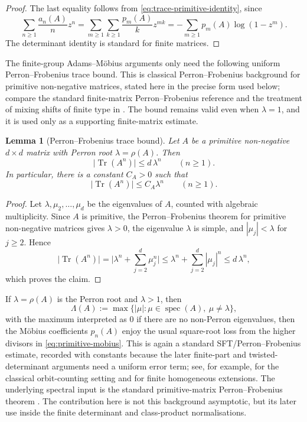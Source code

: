 \documentclass[11pt,a4paper]{amsart}
\theoremstyle{plain}
\newtheorem{lemma}[theorem]{Lemma}
\theoremstyle{definition}
\theoremstyle{remark}
\DeclareMathOperator{\Tr}{Tr}
\DeclareMathOperator{\spec}{spec}
\newcommand{\abs}[1]{\lvert #1 \rvert}
\begin{document}
\begin{proof}
  The last equality follows from \eqref{eq:trace-primitive-identity},
  since
  \[
    \sum_{n\ge 1}\frac{a_n(A)}{n}z^n
    =\sum_{m\ge 1}\sum_{k\ge 1}\frac{p_m(A)}{k}z^{mk}
    =-\sum_{m\ge 1}p_m(A)\log(1-z^m).
  \]
  The determinant identity is standard for finite matrices.
\end{proof}

The finite-group Adams--M\"obius arguments only need the following
uniform Perron--Frobenius trace bound.  This is classical
Perron--Frobenius background for primitive non-negative matrices, stated
here in the precise form used below; compare the standard finite-matrix
Perron--Frobenius reference \cite{Seneta2006NonnegativeMatrices} and the
treatment of mixing shifts of finite type in
\cite{LindMarcus1995,ParryPollicott1990Zeta}.
The bound remains valid even when \(\lambda=1\), and it is used only as a
supporting finite-matrix estimate.

\begin{lemma}[Perron--Frobenius trace bound]
  \label{lem:pf-trace-bound}
  Let \(A\) be a primitive non-negative \(d\times d\) matrix with
  Perron root \(\lambda=\rho(A)\). Then
  \[
    \abs{\Tr(A^n)}\le d\,\lambda^n
    \qquad (n\ge 1).
  \]
  In particular, there is a constant \(C_A>0\) such that
  \[
    \abs{\Tr(A^n)}\le C_A\lambda^n
    \qquad (n\ge 1).
  \]
\end{lemma}

\begin{proof}
  Let \(\lambda,\mu_2,\dots,\mu_d\) be the eigenvalues of \(A\), counted
  with algebraic multiplicity. Since \(A\) is primitive,
  the Perron--Frobenius theorem for primitive non-negative matrices
  \cite{Seneta2006NonnegativeMatrices} gives \(\lambda>0\), the eigenvalue
  \(\lambda\) is simple, and \(|\mu_j|<\lambda\) for \(j\ge 2\). Hence
  \[
    \abs{\Tr(A^n)}
    =
    \abs{\lambda^n+\sum_{j=2}^d\mu_j^n}
    \le
    \lambda^n+\sum_{j=2}^d|\mu_j|^n
    \le
    d\,\lambda^n,
  \]
  which proves the claim.
\end{proof}

If \(\lambda=\rho(A)\) is the Perron root and \(\lambda>1\), then
\[
  \Lambda(A):=\max\{|\mu|:\mu\in\spec(A),\ \mu\neq\lambda\},
\]
with the maximum interpreted as \(0\) if there are no non-Perron
eigenvalues,
then the M\"obius coefficients \(p_n(A)\) enjoy the usual square-root
loss from the higher divisors in \eqref{eq:primitive-mobius}.  This is
again a standard SFT/Perron--Frobenius estimate, recorded with constants
because the later finite-part and twisted-determinant arguments need a
uniform error term; see, for example,
\cite{Parry1983PrimeOrbit,LindMarcus1995,ParryPollicott1990Zeta} for the
classical orbit-counting setting and
\cite{NooraniParry1992ChebotarevShifts} for finite homogeneous extensions.
The underlying spectral input is the standard primitive-matrix
Perron--Frobenius theorem \cite{Seneta2006NonnegativeMatrices}.  The
contribution here is not this
background asymptotic, but its later use inside the finite determinant and
class-product normalisations.
\end{document}
